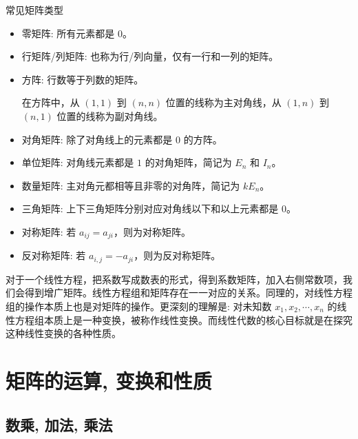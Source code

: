 \documentclass[a4paper,12pt]{ctexart}
\begin{document}
\begin{myprop}{常见矩阵类型}{}
\begin{itemize}
    \item 零矩阵: 所有元素都是 $0$。
    \item 行矩阵/列矩阵: 也称为行/列向量，仅有一行和一列的矩阵。
    \item 方阵: 行数等于列数的矩阵。
    
    在方阵中，从 $(1,1)$ 到 $(n,n)$ 位置的线称为主对角线，从 $(1,n)$ 到 $(n,1)$ 位置的线称为副对角线。
    
    \item 对角矩阵: 除了对角线上的元素都是 $0$ 的方阵。
    \item 单位矩阵: 对角线元素都是 $1$ 的对角矩阵，简记为 $E_n$ 和 $I_n$。
    \item 数量矩阵: 主对角元都相等且非零的对角阵，简记为 $kE_n$。
    \item 三角矩阵: 上下三角矩阵分别对应对角线以下和以上元素都是 $0$。
    \item 对称矩阵: 若 $a_{ij} = a_{ji}$，则为对称矩阵。
    \item 反对称矩阵: 若 $a_{i,j} = - a_{ji}$，则为反对称矩阵。
\end{itemize}
\end{myprop}

对于一个线性方程，把系数写成数表的形式，得到系数矩阵，加入右侧常数项，我们会得到增广矩阵。线性方程组和矩阵存在一一对应的关系。同理的，对线性方程组的操作本质上也是对矩阵的操作。更深刻的理解是: 对未知数 $x_1, x_2, \cdots , x_n$ 的线性方程组本质上是一种变换，被称作线性变换。而线性代数的核心目标就是在探究这种线性变换的各种性质。

\newpage

\section{矩阵的运算, 变换和性质}

\subsection{数乘, 加法, 乘法}
\end{document}
